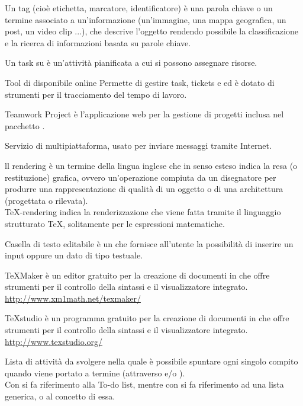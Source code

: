 Un tag (cioè etichetta, marcatore, identificatore) è una parola chiave o un termine associato a un'informazione (un'immagine, una mappa geografica, un post, un video clip ...), che descrive l'oggetto rendendo possibile la classificazione e la ricerca di informazioni basata su parole chiave.

Un task su  è un’attività pianificata a cui si possono assegnare risorse.

Tool di  disponibile online 
Permette di gestire  task, tickets e  ed è dotato di strumenti per il tracciamento del tempo di lavoro.

Teamwork Project è l’applicazione web per la gestione di progetti inclusa nel pacchetto .

Servizio di  multipiattaforma, usato per inviare messaggi tramite Internet.

ll rendering è un termine della lingua inglese che in senso esteso indica la resa (o restituzione) grafica, ovvero un'operazione compiuta da un disegnatore per produrre una rappresentazione di qualità di un oggetto o di una architettura (progettata o rilevata).\\
\TeX -rendering indica la renderizzazione che viene fatta tramite il linguaggio strutturato \TeX, solitamente per le espressioni matematiche.

Casella di testo editabile è un  che fornisce all’utente la possibilità di inserire un input oppure un dato di tipo testuale.

TeXMaker è un editor gratuito per la creazione di documenti in \glossario{\LaTeX} che offre strumenti per il controllo della sintassi e il visualizzatore integrato.\\
\url{http://www.xm1math.net/texmaker/}

TeXstudio è un programma gratuito per la creazione di documenti in \glossario{\LaTeX} che offre strumenti per il controllo della sintassi e il visualizzatore integrato.\\
\url{http://www.texstudio.org/}

Lista di attività da svolgere nella quale è possibile spuntare ogni singolo compito quando viene portato a termine (attraverso  e/o ).\\
Con  si fa riferimento alla  To-do list, mentre con  si fa riferimento ad una lista generica, o al concetto di essa.

